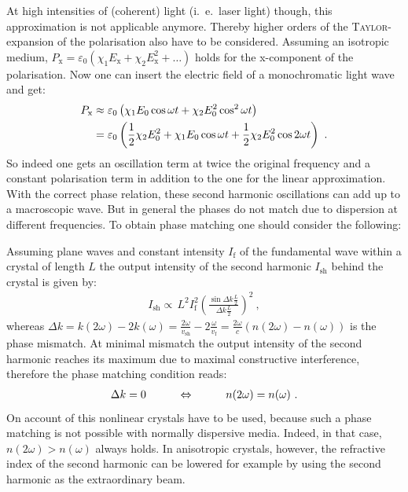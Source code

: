 \documentclass{protokoll_en}
\begin{document}
At high intensities of (coherent) light (i.\ e.\ laser light) though, this approximation is not applicable anymore. Thereby higher orders of the \textsc{Taylor}-expansion of the polarisation also have to be considered. Assuming an isotropic medium, $P_\mathrm{x} = \varepsilon_0 \left( \chi_1 E_\mathrm{x} + \chi_2 E^2_\mathrm{x} + \dots \right)$ holds for the x-component of the polarisation. Now one can insert the electric field of a monochromatic light wave and get:
\begin{align}
P_\mathrm{x} &\approx \varepsilon_0 \left( \chi_1 E_0 \cos{\omega t} + \chi_2 E^2_0 \cos^2{\omega t} \right) \\
             &= \varepsilon_0 \left( \frac{1}{2} \chi_2 E^2_0 + \chi_1 E_0 \cos{\omega t} + \frac{1}{2} \chi_2 E^2_0 \cos{2 \omega t} \right) \ \ldotp
\end{align}
So indeed one gets an oscillation term at twice the original frequency and a constant polarisation term in addition to the one for the linear approximation. With the correct phase relation, these second harmonic oscillations can add up to a macroscopic wave. But in general the phases do not match due to dispersion at different frequencies. To obtain phase matching one should consider the following:

Assuming plane waves and constant intensity $I_\mathrm{f}$ of the fundamental wave within a crystal of length $L$ the output intensity of the second harmonic $I_\mathrm{sh}$ behind the crystal is given by:
\begin{align}
I_{\mathrm{sh}}\propto \, L^2 I^2_{\mathrm{f}} \left( \frac{\sin{\Delta k \frac{L}{2}}}{\Delta k \frac{L}{2}} \right)^2 \ ,
\end{align}
whereas $\Delta k = k(2\omega) - 2 k(\omega) = \frac{2\omega}{v_\mathrm{sh}} - 2 \frac{\omega}{v_\mathrm{f}} = \frac{2\omega}{c} \left( n(2\omega) - n(\omega) \right)$ is the phase mismatch. At minimal mismatch the output intensity of the second harmonic reaches its maximum due to maximal constructive interference, therefore the phase matching condition reads:
\begin{align}
\Delta k = 0 \hspace{1cm} \Leftrightarrow \hspace{1cm} n(2\omega) = n(\omega) \ \ldotp
\end{align}
On account of this nonlinear crystals have to be used, because such a phase matching is not possible with normally dispersive media. Indeed, in that case, $n(2\omega) > n(\omega)$ always holds. In anisotropic crystals, however, the refractive index of the second harmonic can be lowered for example by using the second harmonic as the extraordinary beam.
\end{document}
